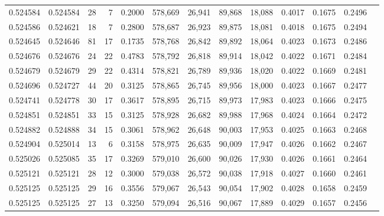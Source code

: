 \begin{tabular}{rrrrrrrrrrrrr}
0.524584 & 0.524584 &    28 &     7 &                                     0.2000 & 578,669 &  26,941 &  89,868 &  18,088 & 0.4017 & 0.1675 & 0.2496 \\
0.524586 & 0.524621 &    18 &     7 &                                     0.2800 & 578,687 &  26,923 &  89,875 &  18,081 & 0.4018 & 0.1675 & 0.2494 \\
0.524645 & 0.524646 &    81 &    17 &                                     0.1735 & 578,768 &  26,842 &  89,892 &  18,064 & 0.4023 & 0.1673 & 0.2486 \\
0.524676 & 0.524676 &    24 &    22 &                                     0.4783 & 578,792 &  26,818 &  89,914 &  18,042 & 0.4022 & 0.1671 & 0.2484 \\
0.524679 & 0.524679 &    29 &    22 &                                     0.4314 & 578,821 &  26,789 &  89,936 &  18,020 & 0.4022 & 0.1669 & 0.2481 \\
0.524696 & 0.524727 &    44 &    20 &                                     0.3125 & 578,865 &  26,745 &  89,956 &  18,000 & 0.4023 & 0.1667 & 0.2477 \\
0.524741 & 0.524778 &    30 &    17 &                                     0.3617 & 578,895 &  26,715 &  89,973 &  17,983 & 0.4023 & 0.1666 & 0.2475 \\
0.524851 & 0.524851 &    33 &    15 &                                     0.3125 & 578,928 &  26,682 &  89,988 &  17,968 & 0.4024 & 0.1664 & 0.2472 \\
0.524882 & 0.524888 &    34 &    15 &                                     0.3061 & 578,962 &  26,648 &  90,003 &  17,953 & 0.4025 & 0.1663 & 0.2468 \\
0.524904 & 0.525014 &    13 &     6 &                                     0.3158 & 578,975 &  26,635 &  90,009 &  17,947 & 0.4026 & 0.1662 & 0.2467 \\
0.525026 & 0.525085 &    35 &    17 &                                     0.3269 & 579,010 &  26,600 &  90,026 &  17,930 & 0.4026 & 0.1661 & 0.2464 \\
0.525121 & 0.525121 &    28 &    12 &                                     0.3000 & 579,038 &  26,572 &  90,038 &  17,918 & 0.4027 & 0.1660 & 0.2461 \\
0.525125 & 0.525125 &    29 &    16 &                                     0.3556 & 579,067 &  26,543 &  90,054 &  17,902 & 0.4028 & 0.1658 & 0.2459 \\
0.525125 & 0.525125 &    27 &    13 &                                     0.3250 & 579,094 &  26,516 &  90,067 &  17,889 & 0.4029 & 0.1657 & 0.2456 \\

\end{tabular}
